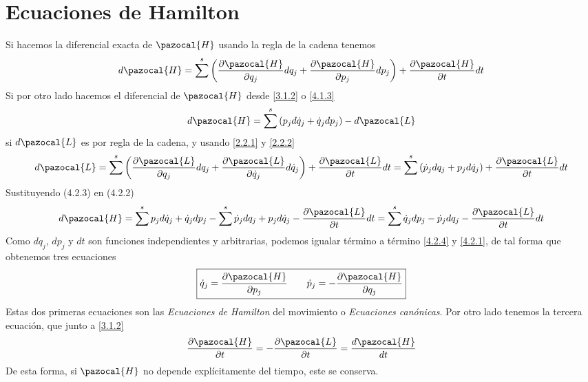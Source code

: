 \section{Ecuaciones de Hamilton} 
Si hacemos la diferencial exacta de $\pazocal{H}$ usando la regla de la cadena tenemos
\begin{equation} \label{4.2.1}
    d\pazocal{H} = \sum^s\left(\frac{\partial \pazocal{H}}{\partial q_j}dq_j+\frac{\partial \pazocal{H}}{\partial p_j}dp_j\right)+\frac{\partial \pazocal{H}}{\partial t} dt
\end{equation} 
Si por otro lado hacemos el diferencial de $\pazocal{H}$ desde \eqref{3.1.2} o \eqref{4.1.3}
\begin{equation} \label{4.2.2}
    d\pazocal{H} = \sum^s\left(p_j d\dot{q}_j+\dot{q}_j dp_j\right)-d\pazocal{L}
\end{equation} 
si $d\pazocal{L}$ es por regla de la cadena, y usando \eqref{2.2.1} y \eqref{2.2.2}
\begin{equation} \label{4.2.3}
    d\pazocal{L}= \sum^s\left(\frac{\partial \pazocal{L}}{\partial q_j}dq_j+\frac{\partial \pazocal{L}}{\partial \dot{q}_j}d\dot{q}_j\right) + \frac{\partial \pazocal{L}}{\partial t}dt = \sum^s\left(\dot{p}_j dq_j+p_j d\dot{q}_j\right) + \frac{\partial \pazocal{L}}{\partial t}dt
\end{equation} 
Sustituyendo (4.2.3) en (4.2.2)
\begin{equation} \label{4.2.4}
    d\pazocal{H} = \sum^s p_j d\dot{q}_j+\dot{q}_j dp_j-\sum^s \dot{p}_j dq_j+p_j d\dot{q}_j - \frac{\partial \pazocal{L}}{\partial t}dt = \sum^s \dot{q}_j dp_j-\dot{p}_j dq_j - \frac{\partial \pazocal{L}}{\partial t}dt
\end{equation} 
Como $dq_j$, $dp_j$ y $dt$ son funciones independientes y arbitrarias, podemos igualar término a término \eqref{4.2.4} y \eqref{4.2.1}, de tal forma que obtenemos tres ecuaciones
\Large \begin{equation} \label{4.2.5}
    \boxed{\dot{q}_j = \frac{\partial \pazocal{H}}{\partial p_j} \ \ \ \ \ \ \dot{p}_j= -\frac{\partial \pazocal{H}}{\partial q_j}}
\end{equation}  \normalsize
Estas dos primeras ecuaciones son las \textit{Ecuaciones de Hamilton} del movimiento o \textit{Ecuaciones canónicas}. Por otro lado tenemos la tercera ecuación, que junto a \eqref{3.1.2}
\begin{equation} \label{4.2.6}
    \frac{\partial \pazocal{H}}{\partial t} = - \frac{\partial \pazocal{L}}{\partial t} = \frac{d \pazocal{H}}{dt}
\end{equation} 
De esta forma, si $\pazocal{H}$ no depende explícitamente del tiempo, este se conserva.

